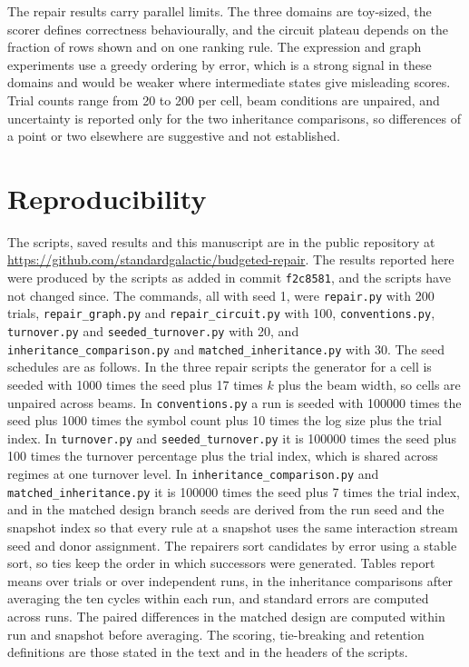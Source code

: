 \documentclass[11pt]{article}
\begin{document}
The repair results carry parallel limits. The three domains are toy-sized, the scorer defines correctness behaviourally, and the circuit plateau depends on the fraction of rows shown and on one ranking rule. The expression and graph experiments use a greedy ordering by error, which is a strong signal in these domains and would be weaker where intermediate states give misleading scores. Trial counts range from 20 to 200 per cell, beam conditions are unpaired, and uncertainty is reported only for the two inheritance comparisons, so differences of a point or two elsewhere are suggestive and not established.

\section{Reproducibility}
\begingroup\sloppy

The scripts, saved results and this manuscript are in the public repository at \url{https://github.com/standardgalactic/budgeted-repair}. The results reported here were produced by the scripts as added in commit \texttt{f2c8581}, and the scripts have not changed since. The commands, all with seed 1, were \texttt{repair.py} with 200 trials, \texttt{repair\_\allowbreak{}graph.py} and \texttt{repair\_\allowbreak{}circuit.py} with 100, \texttt{conventions.py}, \texttt{turnover.py} and \texttt{seeded\_\allowbreak{}turnover.py} with 20, and \texttt{inheritance\_\allowbreak{}comparison.py} and \texttt{matched\_\allowbreak{}inheritance.py} with 30. The seed schedules are as follows. In the three repair scripts the generator for a cell is seeded with 1000 times the seed plus 17 times $k$ plus the beam width, so cells are unpaired across beams. In \texttt{conventions.py} a run is seeded with 100000 times the seed plus 1000 times the symbol count plus 10 times the log size plus the trial index. In \texttt{turnover.py} and \texttt{seeded\_\allowbreak{}turnover.py} it is 100000 times the seed plus 100 times the turnover percentage plus the trial index, which is shared across regimes at one turnover level. In \texttt{inheritance\_\allowbreak{}comparison.py} and \texttt{matched\_\allowbreak{}inheritance.py} it is 100000 times the seed plus 7 times the trial index, and in the matched design branch seeds are derived from the run seed and the snapshot index so that every rule at a snapshot uses the same interaction stream seed and donor assignment. The repairers sort candidates by error using a stable sort, so ties keep the order in which successors were generated. Tables report means over trials or over independent runs, in the inheritance comparisons after averaging the ten cycles within each run, and standard errors are computed across runs. The paired differences in the matched design are computed within run and snapshot before averaging. The scoring, tie-breaking and retention definitions are those stated in the text and in the headers of the scripts.
\endgroup
\end{document}
